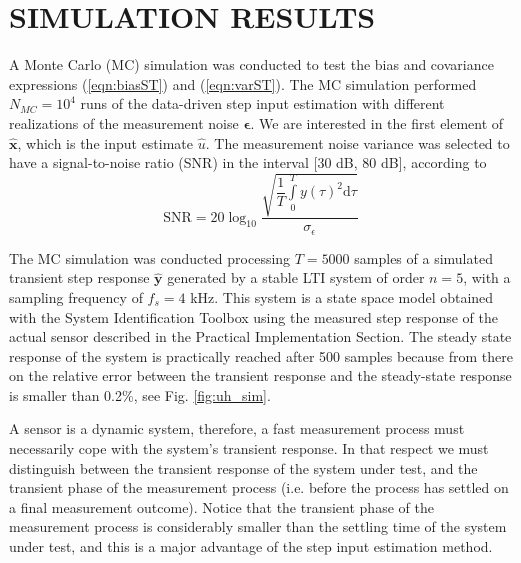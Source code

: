 \section{SIMULATION RESULTS} 

A Monte Carlo (MC) simulation was conducted to test the bias and covariance expressions (\ref{eqn:biasST}) and (\ref{eqn:varST}).
The MC simulation performed $N_{MC} = 10^4$ runs of the data-driven step input estimation with different realizations of the measurement noise $\bm{\epsilon}$.
We are interested in the first element of $\widehat{\mathbf{x}}$, which is the input estimate $\widehat{u}$.
The measurement noise variance was selected to have a signal-to-noise ratio (SNR) in the interval [30 dB, 80 dB], according to
\begin{equation} \mathrm{SNR} = 20 \log_{10}{ \dfrac{ \sqrt{ \dfrac{1}{T} \int\limits_{0}^{T}{ y(\tau)^2  \mathrm{d} \tau } } }{ \sigma_{ \epsilon }} } \end{equation} 

The MC simulation was conducted processing $T = 5000$ samples of a simulated transient step response $\widehat{\mathbf{y}}$ generated by a stable LTI system of order $n = 5$, with a sampling frequency of $f_s=4$ kHz.
This system is a state space model obtained with the System Identification Toolbox using the measured step response of the actual sensor described in the Practical Implementation Section.
The steady state response of the system is practically reached after 500 samples because from there on the relative error between the transient response and the steady-state response is smaller than 0.2\%, see Fig. \ref{fig:uh_sim}.

A sensor is a dynamic system, therefore, a fast measurement process must necessarily cope with the system’s transient response. In that respect we must distinguish between the transient response of the system under test, and the transient phase of the measurement process (i.e. before the process has settled on a final measurement outcome). Notice that the transient phase of the measurement process is considerably smaller than the settling time of the system under test, and this is a major advantage of the step input estimation method.


